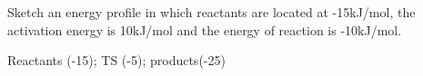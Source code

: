 \documentclass[main.tex]{subfiles}
\begin{document}
\begin{multicols*}{2}
\begin{question}[ID=\the\value{numA}]
Sketch an energy profile in which reactants are located at -15kJ/mol, the activation energy is 10kJ/mol and the energy of reaction is -10kJ/mol.
\end{question}
\begin{solution}
Reactants (-15); TS (-5); products(-25)
 \hspace{0.1cm}\end{solution}%


\end{multicols*}
\end{document}
